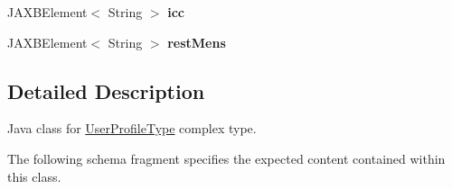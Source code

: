 \begin{DoxyCompactItemize}
\item 
\hypertarget{classcom_1_1telefonica_1_1schemas_1_1unica_1_1rest_1_1directory_1_1v1_1_1UserProfileType_a685ffc20cc8bc3315173ac381c22d85c}{
JAXBElement$<$ String $>$ {\bfseries icc}}
\label{classcom_1_1telefonica_1_1schemas_1_1unica_1_1rest_1_1directory_1_1v1_1_1UserProfileType_a685ffc20cc8bc3315173ac381c22d85c}

\item 
\hypertarget{classcom_1_1telefonica_1_1schemas_1_1unica_1_1rest_1_1directory_1_1v1_1_1UserProfileType_a119f6ee0cdbd9182bb97deac14e0f5f1}{
JAXBElement$<$ String $>$ {\bfseries restMens}}
\label{classcom_1_1telefonica_1_1schemas_1_1unica_1_1rest_1_1directory_1_1v1_1_1UserProfileType_a119f6ee0cdbd9182bb97deac14e0f5f1}

\end{DoxyCompactItemize}


\subsection{Detailed Description}
Java class for \hyperlink{classcom_1_1telefonica_1_1schemas_1_1unica_1_1rest_1_1directory_1_1v1_1_1UserProfileType}{UserProfileType} complex type.

The following schema fragment specifies the expected content contained within this class.


